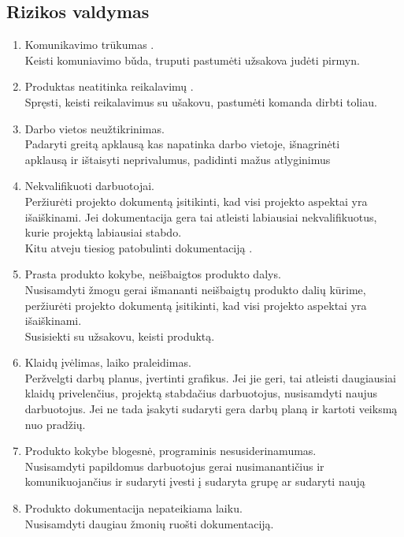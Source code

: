 \documentclass[a4paper,12pt]{article}
\begin{document}
\newpage

\subsection{Rizikos valdymas}
\begin{enumerate}
	\item Komunikavimo tr\= ukumas . \\
 			Keisti komuniavimo b\v uda, truputi pastum\. eti u\v zsakova jud\. eti pirmyn.
  			
  	\item Produktas neatitinka reikalavim\k u . \\
		Spr\k esti, keisti reikalavimus su u\v sakovu, pastum\. eti komanda dirbti toliau.
		
	\item Darbo vietos neu\v ztikrinimas.\\
  			Padaryti greit\k a apklaus\k a kas napatinka darbo vietoje, i\v snagrin\. eti\\
  			apklaus\k a ir i\v staisyti neprivalumus, padidinti ma\v zus atlyginimus
  		
	\item Nekvalifikuoti darbuotojai. \\
			Per\v ziur\. eti projekto dokument\k a \k isitikinti, kad visi projekto aspektai
			yra i\v sai\v skinami.
			Jei dokumentacija gera tai atleisti labiausiai nekvalifikuotus, kurie projekt\k a labiausiai stabdo. \\
			Kitu atveju tiesiog patobulinti dokumentacij\k a
			.
  	
	\item Prasta produkto kokybe, nei\v sbaigtos produkto dalys.\\
			Nusisamdyti \v zmogu gerai i\v smananti nei\v sbaigt\k u produkto dali\k u 
			k\= urime, per\v ziur\. eti projekto dokument\k a \k isitikinti, 
			kad visi projekto aspektai yra i\v sai\v skinami. \\ 
			Susisiekti su u\v zsakovu, keisti produkt\k a.
		
	\item Klaid\k u \k iv\. elimas, laiko praleidimas.\\
  			Per\v zvelgti darb\k u planus, \k ivertinti grafikus.
  			Jei jie geri, tai atleisti daugiausiai klaid\k u privelen\v cius, projekt\k a
  			stabda\v cius darbuotojus, nusisamdyti naujus darbuotojus. Jei ne tada \k isakyti
  			sudaryti gera darb\k u plan\k a ir kartoti veiksm\k a nuo prad\v zi\k u.
  		
	\item Produkto kokybe blogesn\. e, programinis nesusiderinamumas. \\ 
  			Nusisamdyti papildomus darbuotojus gerai nusimananti\v cius ir komunikuojan\v cius
  			ir sudaryti \k ivesti \k i sudaryta grup\k e ar sudaryti nauj\k a
  		
	\item Produkto dokumentacija nepateikiama laiku.\\
  			Nusisamdyti daugiau \v zmoni\k u ruo\v sti dokumentacij\k a.


\end{enumerate}
\end{document}
